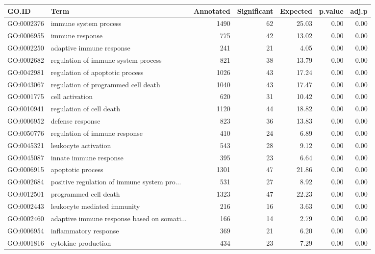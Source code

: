 \begin{table}[ht]
\centering
\begin{tabular}{llrrrrr}
  \hline
GO.ID & Term & Annotated & Significant & Expected & p.value & adj.p \\ 
  \hline
GO:0002376 & immune system process & 1490 &  62 & 25.03 & 0.00 & 0.00 \\ 
  GO:0006955 & immune response & 775 &  42 & 13.02 & 0.00 & 0.00 \\ 
  GO:0002250 & adaptive immune response & 241 &  21 & 4.05 & 0.00 & 0.00 \\ 
  GO:0002682 & regulation of immune system process & 821 &  38 & 13.79 & 0.00 & 0.00 \\ 
  GO:0042981 & regulation of apoptotic process & 1026 &  43 & 17.24 & 0.00 & 0.00 \\ 
  GO:0043067 & regulation of programmed cell death & 1040 &  43 & 17.47 & 0.00 & 0.00 \\ 
  GO:0001775 & cell activation & 620 &  31 & 10.42 & 0.00 & 0.00 \\ 
  GO:0010941 & regulation of cell death & 1120 &  44 & 18.82 & 0.00 & 0.00 \\ 
  GO:0006952 & defense response & 823 &  36 & 13.83 & 0.00 & 0.00 \\ 
  GO:0050776 & regulation of immune response & 410 &  24 & 6.89 & 0.00 & 0.00 \\ 
  GO:0045321 & leukocyte activation & 543 &  28 & 9.12 & 0.00 & 0.00 \\ 
  GO:0045087 & innate immune response & 395 &  23 & 6.64 & 0.00 & 0.00 \\ 
  GO:0006915 & apoptotic process & 1301 &  47 & 21.86 & 0.00 & 0.00 \\ 
  GO:0002684 & positive regulation of immune system pro... & 531 &  27 & 8.92 & 0.00 & 0.00 \\ 
  GO:0012501 & programmed cell death & 1323 &  47 & 22.23 & 0.00 & 0.00 \\ 
  GO:0002443 & leukocyte mediated immunity & 216 &  16 & 3.63 & 0.00 & 0.00 \\ 
  GO:0002460 & adaptive immune response based on somati... & 166 &  14 & 2.79 & 0.00 & 0.00 \\ 
  GO:0006954 & inflammatory response & 369 &  21 & 6.20 & 0.00 & 0.00 \\ 
  GO:0001816 & cytokine production & 434 &  23 & 7.29 & 0.00 & 0.00 \\ 

\end{tabular}
\end{table}
